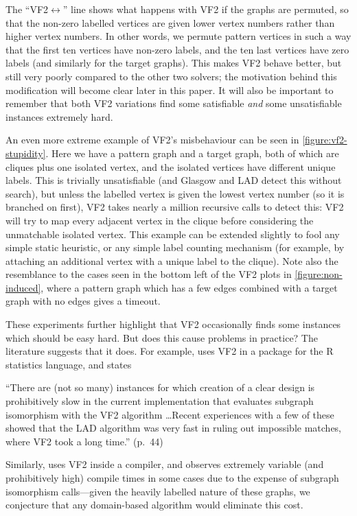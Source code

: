 \documentclass[twoside,11pt]{article}
\begin{document}
The ``VF2${\leftrightarrow}$'' line shows what happens with VF2 if the graphs are permuted, so that
the non-zero labelled vertices are given lower vertex numbers rather than higher vertex numbers.
In other words, we permute pattern vertices in such a way that the first ten vertices have non-zero
labels, and the ten last vertices have zero labels (and similarly for the target graphs).
This makes VF2 behave better, but still very poorly compared to the other two solvers; the
motivation behind this modification will become clear later in this paper.  It will also be
important to remember that both VF2 variations find some satisfiable \emph{and} some unsatisfiable
instances extremely hard.

An even more extreme example of VF2's misbehaviour can be seen in \cref{figure:vf2-stupidity}. Here
we have a pattern graph and a target graph, both of which are cliques plus one isolated vertex, and
the isolated vertices have different unique labels. This is trivially unsatisfiable (and Glasgow and
LAD detect this without search), but unless the labelled vertex is given the lowest vertex number
(so it is branched on first), VF2 takes nearly a million recursive calls to detect this: VF2 will
try to map every adjacent vertex in the clique before considering the unmatchable isolated vertex.
This example can be extended slightly to fool any simple static heuristic, or any simple label
counting mechanism (for example, by attaching an additional vertex with a unique label to the
clique). Note also the resemblance to the cases seen in the bottom left of the VF2 plots in
\cref{figure:non-induced}, where a pattern graph which has a few edges combined with a target graph
with no edges gives a timeout.

These experiments further highlight that VF2 occasionally finds some instances which should be easy hard.
But does this cause problems in practice? The literature suggests that it does. For example,
 uses VF2 in a package for the R statistics language, and states
\begin{displayquote}``There are (not so many) instances for which creation of a clear design is
    prohibitively slow in the current implementation that evaluates subgraph isomorphism with the
    VF2 algorithm \ldots Recent experiences with a few of these showed that the LAD algorithm was
very fast in ruling out impossible matches, where VF2 took a long time.'' (p.\ 44)\end{displayquote}
Similarly,  uses VF2 inside a compiler, and observes extremely variable
(and prohibitively high) compile times in some cases due to the expense of subgraph isomorphism
calls---given the heavily labelled nature of these graphs, we conjecture that any domain-based
algorithm would eliminate this cost.
\end{document}
